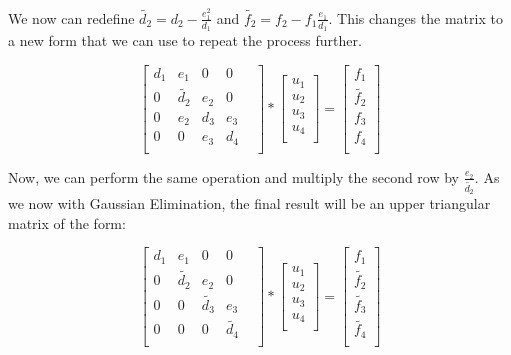\documentclass{article}
\begin{document}
We now can redefine $\tilde{d_{2}}= d_{2}-\frac{e_{1}^{2}}{d_{1}}$ and $\tilde{f_{2}} = f_{2} - f_{1} \frac{e_{1}}{d_{1}} $. This changes the matrix to a new form that we can use to repeat the process further.

\[
\begin{bmatrix}
d_{1}& e_{1}& 0& 0& \\
0& \tilde{d_{2}}& e_{2}& 0& \\
0& e_{2}& d_{3}& e_{3}& \\
0& 0& e_{3}& d_{4}& \\
\end{bmatrix}
*
\begin{bmatrix}
u_{1}\\
u_{2} \\
u_{3}\\
u_{4}\\
\end{bmatrix}
=
\begin{bmatrix}
f_{1}\\
\tilde{f_{2}}\\
f_{3}\\
f_{4}\\
\end{bmatrix}
\]

Now, we can perform the same operation and multiply the second row by $\frac{e_{2}}{\tilde{d_{2}}}$. As we now with Gaussian Elimination, the final result will be an upper triangular matrix of the form:

\[
\begin{bmatrix}
	d_{1}& e_{1}& 0& 0& \\
	0& \tilde{d_{2}}& e_{2}& 0& \\
	0& 0& \tilde{d_{3}}& e_{3}& \\
	0& 0& 0& \tilde{d_{4}}& \\
\end{bmatrix}
*
\begin{bmatrix}
	u_{1}\\
	u_{2} \\
	u_{3}\\
	u_{4}\\
\end{bmatrix}
=
\begin{bmatrix}
	f_{1}\\
	\tilde{f_{2}}\\
	\tilde{f_{3}}\\
	\tilde{f_{4}}\\
\end{bmatrix}
\]
\end{document}
